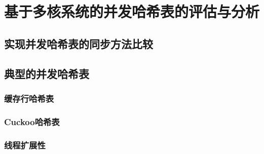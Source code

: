 \chapter{基于多核系统的并发哈希表的评估与分析}

\section{实现并发哈希表的同步方法比较}

\section{典型的并发哈希表}

\subsection{缓存行哈希表}

\subsection{Cuckoo哈希表}

\subsection{线程扩展性}

\subsubsection{}


\subsubsection{}


